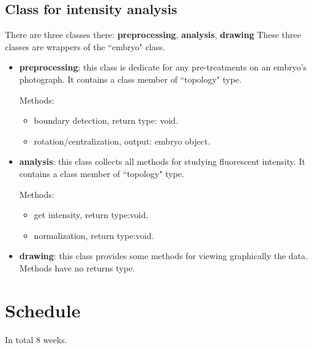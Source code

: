 \documentclass[a4paper,12pt]{article}
\theoremstyle{remark}
\numberwithin{equation}{section}
\begin{document}
	
	\subsection{Class for intensity analysis}
	
	There are three classes there: \textbf{preprocessing}, \textbf{analysis}, \textbf{drawing}
	These three classes are wrappers of the ``embryo" class.
	
	\begin{itemize}
		\item \textbf{preprocessing}: this class is dedicate for any pre-treatments on an embryo's photograph. It contains a class member of ``topology" type.
		
		Methods:
		\begin{itemize}
			\item boundary detection, return type: void. 
			\item rotation/centralization, output: embryo object.
		\end{itemize}
	
		\item \textbf{analysis}: this class collects all methods for studying fluorescent intensity. It contains a class member of ``topology" type.
		
		Methods:
		\begin{itemize}
			\item get intensity, return type:void.
			\item normalization, return type:void.
		\end{itemize}
	
		\item \textbf{drawing}: this class provides some methods for viewing graphically the data. Methods have no returns type.
	\end{itemize}




	\section{Schedule}
	In total 8 weeks.
	
\end{document}
